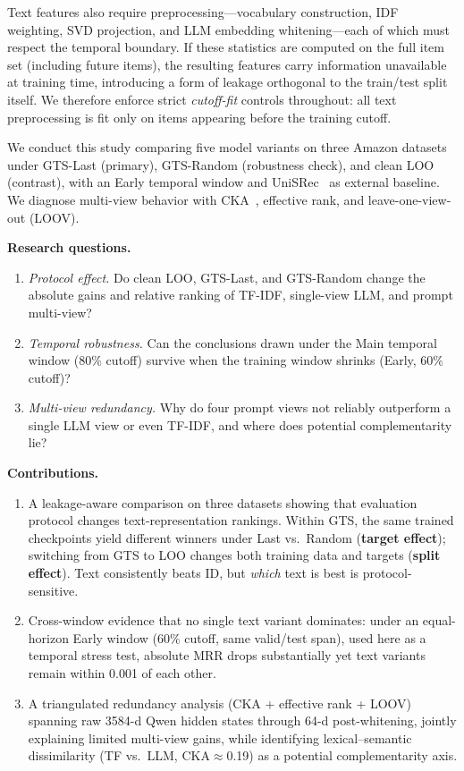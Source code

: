 \documentclass[sigconf,natbib=true,anonymous]{acmart}
\newcommand{\tfidf}{\textsc{TF-IDF}\xspace}
\newcommand{\llm}{\textsc{LLM}\xspace}
\begin{document}
Text features also require preprocessing---vocabulary construction, IDF weighting, SVD projection, and LLM embedding whitening---each of which must respect the temporal boundary.
If these statistics are computed on the full item set (including future items), the resulting features carry information unavailable at training time, introducing a form of leakage orthogonal to the train/test split itself.
We therefore enforce strict \emph{cutoff-fit} controls throughout: all text preprocessing is fit only on items appearing before the training cutoff.

We conduct this study comparing five model variants on three Amazon datasets under GTS-Last (primary), GTS-Random (robustness check), and clean LOO (contrast), with an Early temporal window and UniSRec~\cite{hou2022unisrec} as external baseline.
We diagnose multi-view behavior with CKA~\cite{kornblith2019cka}, effective rank, and leave-one-view-out (LOOV).

\smallskip\noindent\textbf{Research questions.}
\begin{enumerate}[leftmargin=*,itemsep=1pt]
\item[\textbf{RQ1}] \emph{Protocol effect.}
Do clean LOO, GTS-Last, and GTS-Random change the absolute gains and relative ranking of \tfidf, single-view \llm, and prompt multi-view?
\item[\textbf{RQ2}] \emph{Temporal robustness.}
Can the conclusions drawn under the Main temporal window ($80\%$ cutoff) survive when the training window shrinks (Early, $60\%$ cutoff)?
\item[\textbf{RQ3}] \emph{Multi-view redundancy.}
Why do four prompt views not reliably outperform a single \llm view or even \tfidf, and where does potential complementarity lie?
\end{enumerate}

\smallskip\noindent\textbf{Contributions.}
\begin{enumerate}[leftmargin=*,itemsep=1pt]
\item A leakage-aware comparison on three datasets showing that evaluation protocol changes text-representation rankings.  Within GTS, the same trained checkpoints yield different winners under Last vs.\ Random (\textbf{target effect}); switching from GTS to LOO changes both training data and targets (\textbf{split effect}).  Text consistently beats ID, but \emph{which} text is best is protocol-sensitive.
\item Cross-window evidence that no single text variant dominates: under an equal-horizon Early window ($60\%$ cutoff, same valid/test span), used here as a temporal stress test, absolute MRR drops substantially yet text variants remain within 0.001 of each other.
\item A triangulated redundancy analysis (CKA + effective rank + LOOV) spanning raw 3584-d Qwen hidden states through 64-d post-whitening, jointly explaining limited multi-view gains, while identifying lexical--semantic dissimilarity (TF vs.\ LLM, CKA$\approx$0.19) as a potential complementarity axis.
\end{enumerate}
\end{document}
